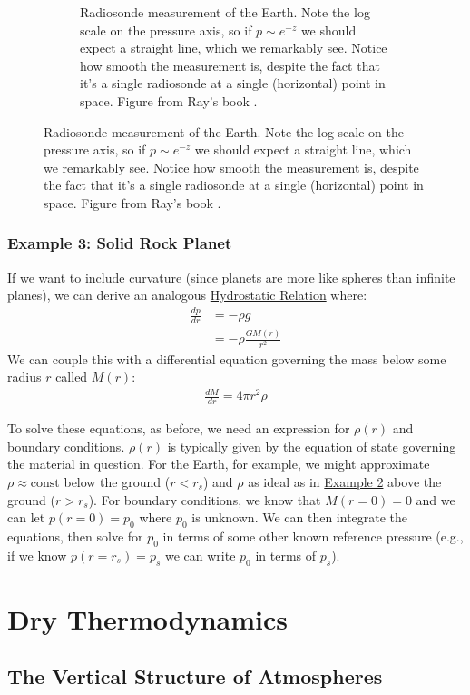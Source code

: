 \begin{figure}[H]
\begin{subfigure}{0.45\linewidth}
    \caption{Radiosonde measurement of the Earth. Note the log scale on the pressure axis, so if $p\sim e^{-z}$ we should expect a straight line, which we remarkably see. Notice how smooth the measurement is, despite the fact that it's a single radiosonde at a single  (horizontal) point in space. Figure from Ray's book \cite{Ray}.}
    \end{subfigure}
\end{figure}

\subsection{Example 3: Solid Rock Planet}

If we want to include curvature (since planets are more like spheres than infinite planes), we can derive an analogous \hyperref[Hydrostatic Balance]{Hydrostatic Relation} where:
\begin{align*}
    \frac{d p}{d r}&=-\rho g\\
    &=-\rho \frac{G M(r)}{r^{2}}
\end{align*}
We can couple this with a differential equation governing the mass below some radius $r$ called $M(r)$:
\begin{align*}
    \frac{d M}{d r} = 4\pi r^2\rho
\end{align*}

To solve these equations, as before, we need an expression for $\rho(r)$ and boundary conditions. $\rho(r)$ is typically given by the equation of state governing the material in question. For the Earth, for example, we might approximate $\rho\approx \text{const}$ below the ground ($r<r_s$) and $\rho$ as ideal as in \hyperref[Example 2: Ideal Gas]{Example 2} above the ground ($r>r_s$). For boundary conditions, we know that $M(r=0)=0$ and we can let $p(r=0)=p_0$ where $p_0$ is unknown. We can then integrate the equations, then solve for $p_0$ in terms of some other known reference pressure (e.g., if we know $p(r=r_s)=p_s$ we can write $p_0$ in terms of $p_s$).

\chapter{Dry Thermodynamics}\label{Dry Thermodynamics}

\section{The Vertical Structure of Atmospheres}\label{Vertical Structure}

